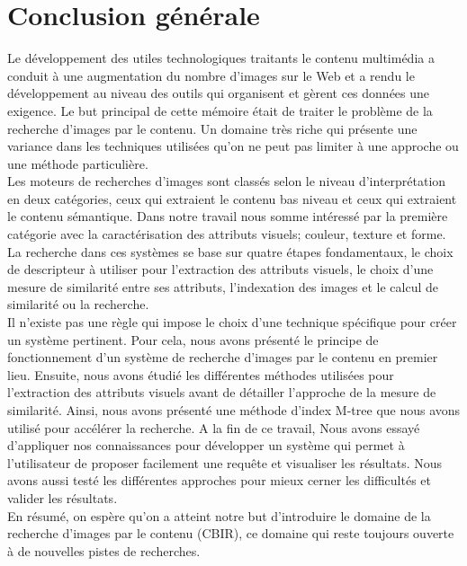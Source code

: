 \chapter*{Conclusion générale}
Le développement des utiles technologiques traitants le contenu multimédia a conduit à une augmentation du nombre d’images sur le Web et a rendu le développement au niveau des outils qui organisent et gèrent ces données une exigence. Le but principal de cette mémoire était de traiter le problème de la recherche d’images par le contenu. Un domaine très riche qui présente une variance dans les techniques utilisées qu’on ne peut pas limiter à une approche ou une méthode particulière.\\

Les moteurs de recherches d’images sont classés selon le niveau d'interprétation en deux catégories, ceux qui extraient le contenu bas niveau et ceux qui extraient le contenu sémantique. Dans notre travail nous somme
intéressé par la première catégorie avec la caractérisation des attributs visuels; couleur, texture et forme. La recherche dans ces systèmes se base sur quatre étapes fondamentaux, le choix de descripteur à utiliser pour l'extraction des attributs visuels, le choix d'une mesure de similarité entre ses attributs, l’indexation des images et le calcul de similarité ou la recherche.\\

Il n’existe pas une règle qui impose le choix d’une technique spécifique pour créer un système pertinent. Pour cela, nous avons présenté le principe de fonctionnement d’un système de recherche d’images par le contenu en premier lieu. Ensuite, nous avons étudié les différentes méthodes utilisées
pour l’extraction des attributs visuels avant de détailler l’approche de la mesure de similarité. Ainsi, nous avons présenté une méthode d'index M-tree que nous avons utilisé pour accélérer la recherche. A la fin de ce travail, Nous avons essayé d’appliquer nos connaissances pour développer un système qui permet à l’utilisateur de proposer facilement
une requête et visualiser les résultats. Nous avons aussi testé les différentes approches pour mieux cerner les difficultés et valider les résultats.\\
En résumé, on espère qu’on a atteint notre but d’introduire le domaine de la recherche d’images par le contenu (CBIR), ce domaine qui reste toujours ouverte à de nouvelles pistes de recherches.